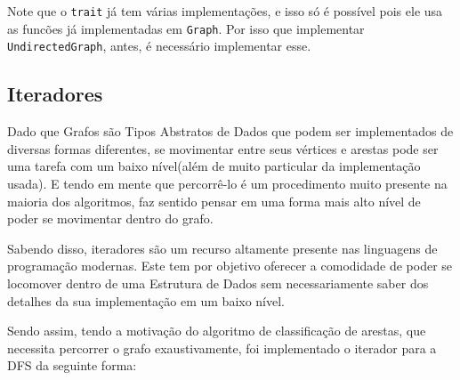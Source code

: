 Note que o \texttt{trait} já tem várias implementações, e isso só é possível pois ele usa as funcões já implementadas em \texttt{Graph}. Por isso que implementar \texttt{UndirectedGraph}, antes, é necessário implementar esse.

\subsection{Iteradores}

Dado que Grafos são Tipos Abstratos de Dados que podem ser implementados de diversas formas diferentes, se movimentar entre seus vértices e arestas pode ser uma tarefa com um baixo nível(além de muito particular da implementação usada). E tendo em mente que percorrê-lo é um procedimento muito presente na maioria dos algoritmos, faz sentido pensar em uma forma mais alto nível de poder se movimentar dentro do grafo.

Sabendo disso, iteradores são um recurso altamente presente nas linguagens de programação modernas. Este tem por objetivo oferecer a comodidade de poder se locomover dentro de uma Estrutura de Dados sem necessariamente saber dos detalhes da sua implementação em um baixo nível.

Sendo assim, tendo a motivação do algoritmo de classificação de arestas, que necessita percorrer o grafo exaustivamente, foi implementado o iterador para a DFS da seguinte forma:

